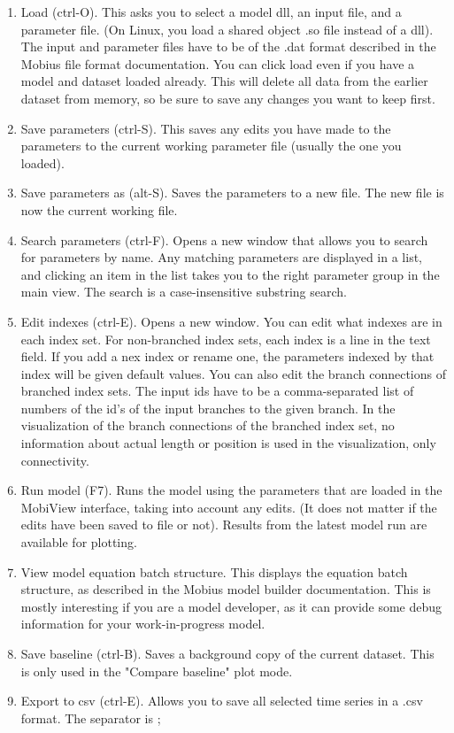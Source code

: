 \documentclass[11pt]{article}
\theoremstyle{definition}
\begin{document}
\begin{enumerate}
\item Load (ctrl-O). This asks you to select a model dll, an input file, and a parameter file. (On Linux, you load a shared object .so file instead of a dll). The input and parameter files have to be of the .dat format described in the Mobius file format documentation. You can click load even if you have a model and dataset loaded already. This will delete all data from the earlier dataset from memory, so be sure to save any changes you want to keep first.
\item Save parameters (ctrl-S). This saves any edits you have made to the parameters to the current working parameter file (usually the one you loaded).
\item Save parameters as (alt-S). Saves the parameters to a new file. The new file is now the current working file.
\item Search parameters (ctrl-F). Opens a new window that allows you to search for parameters by name. Any matching parameters are displayed in a list, and clicking an item in the list takes you to the right parameter group in the main view. The search is a case-insensitive substring search.
\item Edit indexes (ctrl-E). Opens a new window. You can edit what indexes are in each index set. For non-branched index sets, each index is a line in the text field. If you add a nex index or rename one, the parameters indexed by that index will be given default values. You can also edit the branch connections of branched index sets. The input ids have to be a comma-separated list of numbers of the id's of the input branches to the given branch. In the visualization of the branch connections of the branched index set, no information about actual length or position is used in the visualization, only connectivity.
\item Run model (F7). Runs the model using the parameters that are loaded in the MobiView interface, taking into account any edits. (It does not matter if the edits have been saved to file or not). Results from the latest model run are available for plotting.
\item View model equation batch structure. This displays the equation batch structure, as described in the Mobius model builder documentation. This is mostly interesting if you are a model developer, as it can provide some debug information for your work-in-progress model.
\item Save baseline (ctrl-B). Saves a background copy of the current dataset. This is only used in the "Compare baseline" plot mode.
\item Export to csv (ctrl-E). Allows you to save all selected time series in a .csv format. The separator is ;
\end{enumerate}
\end{document}
